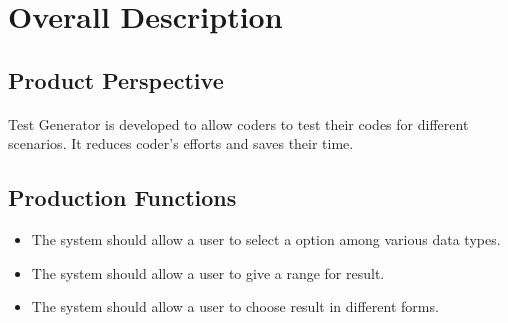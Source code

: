 \documentclass{article}
\begin{document}
\section{Overall Description}
\subsection{Product Perspective} 
\paragraph{}
Test Generator is developed to allow coders to test their codes for different scenarios. It reduces coder's efforts and saves their time.

\subsection{Production Functions} 
\begin{itemize}
\item The system should allow a user to select a option among various data types.
\item The system should allow a user to give a range for result.
\item The system should allow a user to choose result in different forms.
\end{itemize}
\end{document}
